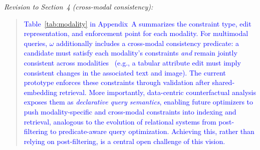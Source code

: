 \noindent\emph{Revision to Section~4 (cross-modal consistency):}
\begin{quote}
\textcolor{blue}{Table~\ref{tab:modality} in Appendix~A summarizes the constraint type, edit representation, and enforcement point for each modality. For multimodal queries, $\omega$ additionally includes a cross-modal consistency predicate: a candidate must satisfy each modality's constraints \emph{and} remain jointly consistent across modalities~\cite{chen2019cross} (e.g., a tabular attribute edit must imply consistent changes in the associated text and image). The current prototype enforces these constraints through validation after shared-embedding retrieval. More importantly, data-centric counterfactual analysis exposes them as \emph{declarative query semantics}, enabling future optimizers to push modality-specific and cross-modal constraints into indexing and retrieval, analogous to the evolution of relational systems from post-filtering to predicate-aware query optimization. Achieving this, rather than relying on post-filtering, is a central open challenge of this vision.}
\end{quote}
